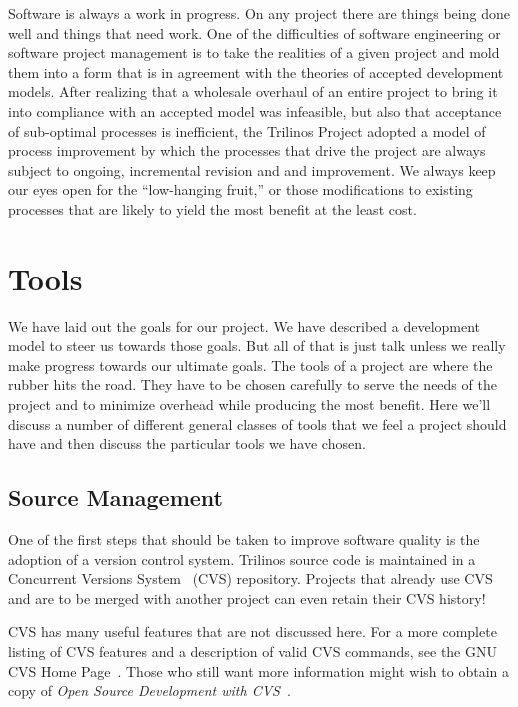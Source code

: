 \documentclass[12pt,relax]{article}
\begin{document}
Software is always a work in progress.  On any project there are things
being done well and things that need work.  One of the difficulties of 
software engineering or software project management is to take the realities
of a given project and mold them into a form that is in agreement with the
theories of accepted development models.  After realizing that a wholesale 
overhaul of an entire project to bring it into compliance with an accepted
model was infeasible, but also that acceptance of sub-optimal processes is
inefficient, the Trilinos Project adopted a model of process improvement by
which the processes that drive the project are always subject to ongoing,
incremental revision and and improvement.  We always keep our eyes open for the 
``low-hanging fruit,'' or those modifications to existing processes that are
likely to yield the most benefit at the least cost.

\clearpage


\section{Tools}
\label{Section:Tools}

We have laid out the goals for our project.  We have described a development
model to steer us towards those goals.  But all of that is just talk unless we
really make progress towards our ultimate goals.  The tools of a project are
where the rubber hits the road.  They have to be chosen carefully to serve the
needs of the project and to minimize overhead while producing the most benefit.
Here we'll discuss a number of different general classes of tools that we feel
a project should have and then discuss the particular tools we have chosen.

\subsection{Source Management}
One of the first steps that should be taken to improve software quality is the 
adoption of a version control system.  Trilinos source code is maintained in a 
Concurrent Versions System~\cite{CVS}
(CVS) repository.  Projects that already use CVS and are to be merged with 
another project can even retain their CVS history!

CVS has many useful features that are not discussed here.  For a more 
complete listing of CVS features and a description of valid CVS commands, 
see the GNU CVS Home Page~\cite{CVS}.  Those who still want more information 
might wish to obtain a copy of 
{\it Open Source Development with CVS}~\cite{FogelBarCVS}.
\end{document}
